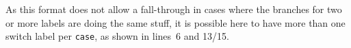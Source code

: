 As this format does not allow a fall-through in cases where the branches for two or more labels are doing the same stuff, it is possible here to have more than one switch label per \lstinline|case|, as shown in lines~6 and 13/15.

